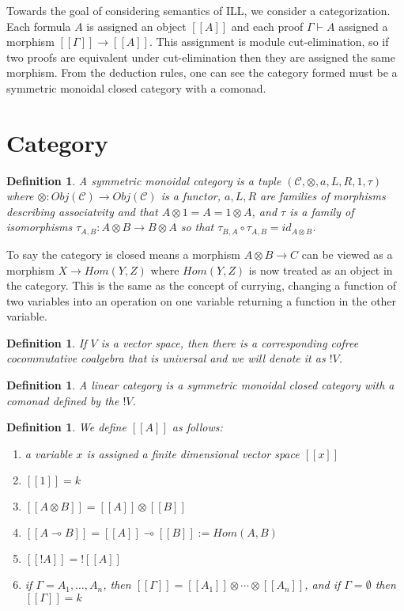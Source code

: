 \documentclass[12pt,a4paper]{article}
\newtheorem{definition}[theorem]{Definition}
\newcommand\CC{\mathcal{C}}
\begin{document}
Towards the goal of considering semantics of ILL, we consider a categorization.
Each formula $A$ is assigned an object $[[A]]$ and each proof $\Gamma\vdash A$ assigned a morphism $[[\Gamma]]\to[[A]]$.
This assignment is module cut-elimination, so if two proofs are equivalent under cut-elimination then they are assigned the same morphism.
From the deduction rules, one can see the category formed must be a symmetric monoidal closed category with a comonad.


\section{Category}
\begin{definition}
    A symmetric monoidal category is a tuple $(\CC,\otimes,a,L,R,1,\tau)$ where $\otimes:Obj(\CC)\to Obj(\CC)$ is a functor, $a,L,R$ are families of morphisms describing associatvity and that $A\otimes1=A=1\otimes A$, and $\tau$ is a family of isomorphisms $\tau_{A,B}:A\otimes B\to B\otimes A$ so that $\tau_{B,A}\circ\tau_{A,B}=id_{A\otimes B}$.
\end{definition}

To say the category is closed means a morphism $A\otimes B\to C$ can be viewed as a morphism $X\to Hom(Y,Z)$ where $Hom(Y,Z)$ is now treated as an object in the category.
This is the same as the concept of currying, changing a function of two variables into an operation on one variable returning a function in the other variable.\\

\begin{definition}
    If $V$ is a vector space, then there is a corresponding cofree cocommutative coalgebra that is universal and we will denote it as $!V$.
\end{definition}

\begin{definition}
    A linear category is a symmetric monoidal closed category with a comonad defined by the $!V$.
\end{definition}

\begin{definition}
    We define $[[A]]$ as follows:
    \begin{enumerate}
        \item a variable $x$ is assigned a finite dimensional vector space $[[x]]$
        \item $[[1]]=k$
        \item $[[A\otimes B]]=[[A]]\otimes[[B]]$
        \item $[[A\multimap B]]=[[A]]\multimap [[B]]:=Hom(A,B)$
        \item $[[!A]]=![[A]]$
        \item if $\Gamma=A_1,\ldots,A_n$, then $[[\Gamma]]=[[A_1]]\otimes\cdots\otimes[[A_n]]$, and if $\Gamma=\emptyset$ then $[[\Gamma]]=k$
    \end{enumerate}
\end{definition}
\end{document}
